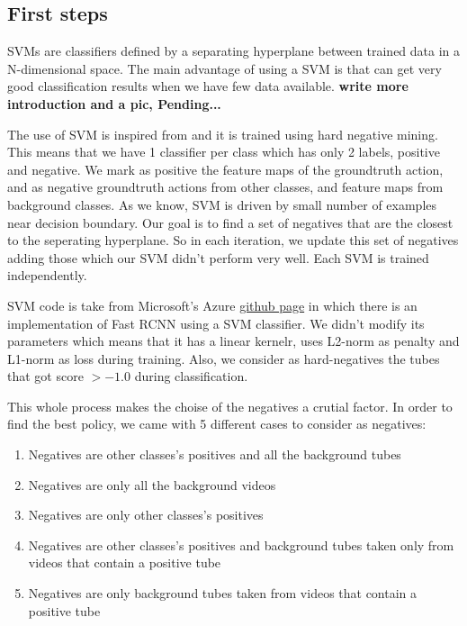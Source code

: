 \subsection{First steps}
SVMs are classifiers defined by a separating hyperplane between trained data in a N-dimensional space. The main advantage of using a SVM
is that can get very good classification results when we have few data available. 
\textbf{write more introduction and a pic, Pending...} \par
The use of SVM is inspired from \cite{Girshick:2015:FR:2919332.2920125} and it is trained using hard negative mining. 
This means that we have 1 classifier per class which has only 2 labels, positive and negative. We mark as positive the feature maps of the
groundtruth action, and as negative groundtruth actions from other classes, and feature maps from background classes.
As we know, SVM is driven by small number of examples near decision boundary. Our goal is to find a set of negatives that are the closest to
the seperating hyperplane. So in each iteration, we update this set of negatives adding those which our SVM didn't perform very well. Each
SVM is trained independently. \par
SVM code is take from Microsoft's Azure \href{https://github.com/Azure/ObjectDetectionUsingCntk} {github page} in which there is an implementation
of Fast RCNN using a SVM classifier. We didn't modify its parameters which means that it has a linear kernelr, uses  L2-norm as penalty and L1-norm
as loss during training. Also, we consider as hard-negatives the tubes that got score $ >  -1.0 $ during classification.\par
This whole process makes the choise of the negatives a crutial factor. In order to find the best policy,  we came with 5 different cases to consider
as negatives:
\begin{enumerate}
\item Negatives are other classes's positives and all the background tubes
\item Negatives are only all the background videos
\item Negatives are only other classes's positives
\item Negatives are other classes's positives and background tubes taken only from videos that contain a positive tube
\item Negatives are only background tubes taken from videos that contain a positive tube
\end{enumerate}

